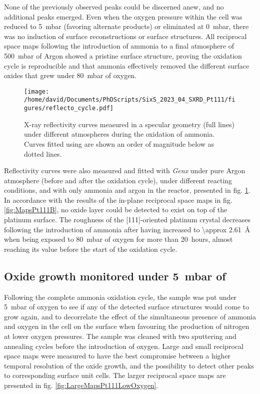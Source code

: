 None of the previously observed peaks could be discerned anew, and no additional peaks emerged.
Even when the oxygen pressure within the cell was reduced to \qty{5}{\milli\bar} (favoring alternate products) or eliminated at \qty{0}{\milli\bar}, there was no induction of surface reconstructions or surface structures.
All reciprocal space maps following the introduction of ammonia to a final atmosphere of \qty{500}{\milli\bar} of Argon showed a pristine surface structure, proving the oxidation cycle is reproducible and that ammonia effectively removed the different surface oxides that grew under \qty{80}{\milli\bar} of oxygen.

\begin{figure}[!htb]
    \centering
    \texttt{[image: /home/david/Documents/PhDScripts/SixS\_2023\_04\_SXRD\_Pt111/figures/reflecto\_cycle.pdf]}
    \caption{
    	X-ray reflectivity curves measured in a specular geometry (full lines) under different atmospheres during the oxidation of ammonia.
    	Curves fitted using  are shown an order of magnitude below as dotted lines.
    }
    \label{fig:ReflectoCycle}
\end{figure}

Reflectivity curves were also measured and fitted with \textit{Genx} under pure Argon atmosphere (before and after the oxidation cycle), under different reacting conditions, and with only ammonia and argon in the reactor, presented in fig. \ref{fig:ReflectoCycle}.
In accordance with the results of the in-plane reciprocal space maps in fig. \ref{fig:MapsPt111B}, no oxide layer could be detected to exist on top of the platinum surface.
The roughness of the [111]-oriented platinum crystal decreases following the introduction of ammonia after having increased to \qty{\approx 2.61}{\angstrom} when being exposed to \qty{80}{\milli\bar} of oxygen for more than \qty{20}{hours}, almost reaching its value before the start of the oxidation cycle.

\subsection{Oxide growth monitored under \qty{5}{\milli\bar} of \dioxygen}

Following the complete ammonia oxidation cycle, the sample was put under \qty{5}{\milli\bar} of oxygen to see if any of the detected surface structures would come to grow again, and to decorrelate the effect of the simultaneous presence of ammonia and oxygen in the cell on the surface when favouring the production of nitrogen at lower oxygen pressures.
The sample was cleaned with two sputtering and annealing cycles before the introduction of oxygen.
Large and small reciprocal space maps were measured to have the best compromise between a higher temporal resolution of the oxide growth, and the possibility to detect other peaks to corresponding surface unit cells.
The larger reciprocal space maps are presented in fig. \ref{fig:LargeMapsPt111LowOxygen}.

